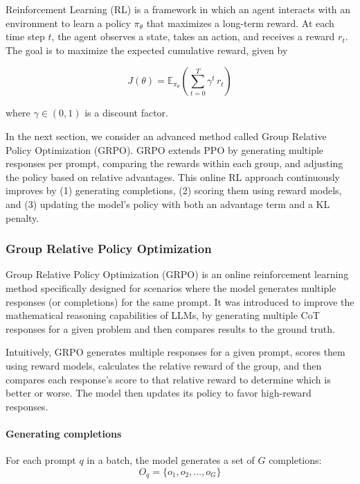 Reinforcement Learning (RL) is a framework in which an agent interacts with an environment to learn a policy $\pi_\theta$ that maximizes a long-term reward. At each time step $t$, the agent observes a state, takes an action, and receives a reward $r_t$. The goal is to maximize the expected cumulative reward, given by

\begin{equation}
J(\theta) = \mathbb{E}_{\pi_\theta}\left( \sum_{t=0}^{T} \gamma^t\,r_t\right)
\end{equation}

where $\gamma\in(0,1)$ is a discount factor.

In the next section, we consider an advanced method called Group Relative Policy Optimization (GRPO). GRPO extends PPO by generating multiple responses per prompt, comparing the rewards within each group, and adjusting the policy based on relative advantages. This online RL approach continuously improves by (1) generating completions, (2) scoring them using reward models, and (3) updating the model's policy with both an advantage term and a KL penalty.

\subsubsection{Group Relative Policy Optimization} \label{app:grpo}

Group Relative Policy Optimization (GRPO) \citet{DeepSeek-AIDEEPSEEKR12025} is an online reinforcement learning method specifically designed for scenarios where the model generates multiple responses (or completions) for the same prompt. It was introduced to improve the mathematical reasoning capabilities of LLMs, by generating multiple CoT responses for a given problem and then compares results to the ground truth.

Intuitively, GRPO generates multiple responses for a given prompt, scores them using reward models, calculates the relative reward of the group, and then compares each response's score to that relative reward to determine which is better or worse. The model then updates its policy to favor high-reward responses.

\paragraph{Generating completions} For each prompt $q$ in a batch, the model generates a set of $G$ completions:
\begin{equation}
O_q = \{o_1, o_2, \ldots, o_G\}
\end{equation}

